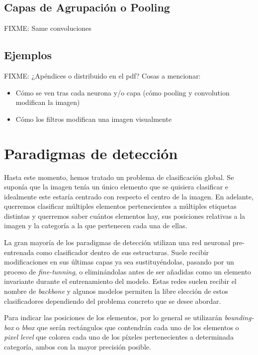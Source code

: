 \section{Capas de Agrupación o Pooling}

FIXME: Same convoluciones

\section{Ejemplos}

FIXME: ¿Apéndices o distribuido en el pdf? Cosas a mencionar:

\begin{itemize}
\item Cómo se ven tras cada neurona y/o capa (cómo pooling y convolution modifican la imagen)
\item Cómo los filtros modifican una imagen visualmente
\end{itemize}

\chapter{Paradigmas de detección}
Hasta este momento, hemos tratado un problema de clasificación global. Se suponía que la imagen tenía un único elemento que se quisiera clasificar e idealmente este estaría centrado con respecto el centro de la imagen. En adelante, querremos clasificar múltiples elementos pertenecientes a múltiples etiquetas distintas y querremos saber cuántos elementos hay, sus posiciones relativas a la imagen y la categoría a la que pertenecen cada una de ellas.\newline

La gran mayoría de los paradigmas de detección utilizan una red neuronal pre-entrenada como clasificador dentro de sus estructuras. Suele recibir modificaciones en sus últimas capas ya sea sustituyéndolas, pasando por un proceso de \emph{fine-tunning}, o eliminándolas antes de ser añadidas como un elemento invariante durante el entrenamiento del modelo. Estas redes suelen recibir el nombre de \emph{backbone} y algunos modelos permiten la libre elección de estos clasificadores dependiendo del problema concreto que se desee abordar.\newline

Para indicar las posiciones de los elementos, por lo general se utilizarán \emph{bounding-box} o \emph{bbox} que serán rectángulos que contendrán cada uno de los elementos o \emph{pixel level} que colorea cada uno de los píxeles pertenecientes a determinada categoría, ambos con la mayor precisión posible.

